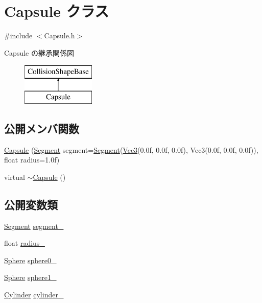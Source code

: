 \hypertarget{class_capsule}{}\section{Capsule クラス}
\label{class_capsule}


{\ttfamily \#include $<$Capsule.\+h$>$}

Capsule の継承関係図\begin{figure}[H]
\begin{center}
\leavevmode
\includegraphics[height=2.000000cm]{class_capsule}
\end{center}
\end{figure}
\subsection*{公開メンバ関数}
\begin{DoxyCompactItemize}
\item 
\mbox{\hyperlink{class_capsule_aeef9aff581e55f6b091854c3ca9a8a8d}{Capsule}} (\mbox{\hyperlink{class_segment}{Segment}} segment=\mbox{\hyperlink{class_segment}{Segment}}(\mbox{\hyperlink{_vector3_d_8h_ab16f59e4393f29a01ec8b9bbbabbe65d}{Vec3}}(0.\+0f, 0.\+0f, 0.\+0f), Vec3(0.\+0f, 0.\+0f, 0.\+0f)), float radius=1.\+0f)
\item 
virtual \mbox{\hyperlink{class_capsule_abfd7f0348ce8e7f8ee4e70374ae27533}{$\sim$\+Capsule}} ()
\end{DoxyCompactItemize}
\subsection*{公開変数類}
\begin{DoxyCompactItemize}
\item 
\mbox{\hyperlink{class_segment}{Segment}} \mbox{\hyperlink{class_capsule_a9557489d45b8a343f58d815965be988c}{segment\+\_\+}}
\item 
float \mbox{\hyperlink{class_capsule_a5a479b152df710dba41b6529cf11199c}{radius\+\_\+}}
\item 
\mbox{\hyperlink{class_sphere}{Sphere}} \mbox{\hyperlink{class_capsule_a37c7db7fe8cb06be2f374d7aba24267e}{sphere0\+\_\+}}
\item 
\mbox{\hyperlink{class_sphere}{Sphere}} \mbox{\hyperlink{class_capsule_ac478efc95993a85908a7cd2759133ab2}{sphere1\+\_\+}}
\item 
\mbox{\hyperlink{class_cylinder}{Cylinder}} \mbox{\hyperlink{class_capsule_a7b7f46d36a0d810555aa5eb62da6a8ed}{cylinder\+\_\+}}
\end{DoxyCompactItemize}
